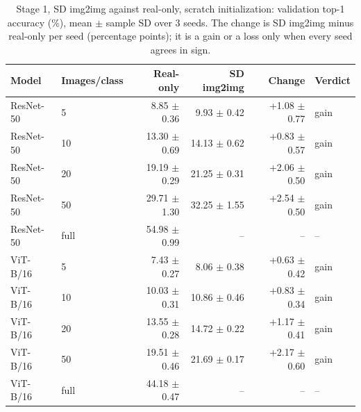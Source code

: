 \begin{table}[H]
\centering
\caption{Stage 1, SD img2img against real-only, scratch initialization: validation top-1 accuracy (\%), mean $\pm$ sample SD over 3 seeds. The change is SD img2img minus real-only per seed (percentage points); it is a gain or a loss only when every seed agrees in sign.}
\label{tab:stage1-scratch-accuracy-sd_img2img}
\begin{tabular}{llrrrl}
\toprule
Model & Images/class & Real-only & SD img2img & Change & Verdict \\
\midrule
ResNet-50 & 5 & 8.85 $\pm$ 0.36 & 9.93 $\pm$ 0.42 & +1.08 $\pm$ 0.77 & gain \\
ResNet-50 & 10 & 13.30 $\pm$ 0.69 & 14.13 $\pm$ 0.62 & +0.83 $\pm$ 0.57 & gain \\
ResNet-50 & 20 & 19.19 $\pm$ 0.29 & 21.25 $\pm$ 0.31 & +2.06 $\pm$ 0.50 & gain \\
ResNet-50 & 50 & 29.71 $\pm$ 1.30 & 32.25 $\pm$ 1.55 & +2.54 $\pm$ 0.50 & gain \\
ResNet-50 & full & 54.98 $\pm$ 0.99 & -- & -- & -- \\
\midrule
ViT-B/16 & 5 & 7.43 $\pm$ 0.27 & 8.06 $\pm$ 0.38 & +0.63 $\pm$ 0.42 & gain \\
ViT-B/16 & 10 & 10.03 $\pm$ 0.31 & 10.86 $\pm$ 0.46 & +0.83 $\pm$ 0.34 & gain \\
ViT-B/16 & 20 & 13.55 $\pm$ 0.28 & 14.72 $\pm$ 0.22 & +1.17 $\pm$ 0.41 & gain \\
ViT-B/16 & 50 & 19.51 $\pm$ 0.46 & 21.69 $\pm$ 0.17 & +2.17 $\pm$ 0.60 & gain \\
ViT-B/16 & full & 44.18 $\pm$ 0.47 & -- & -- & -- \\
\bottomrule
\end{tabular}
\end{table}
